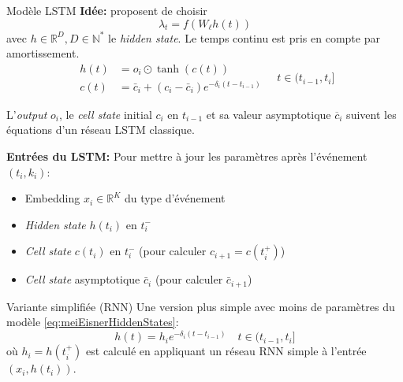 \documentclass{beamer}
\newcommand{\RR}{\mathbb{R}}
\newcommand{\NN}{\mathbb{N}}
\begin{document}
\begin{frame}{Modèle LSTM \autocite{meiEisnerNeuralHawkes}}
\textbf{Idée:} \citeauthor{meiEisnerNeuralHawkes} proposent de choisir 
\begin{equation}
\lambda_t = f(W_\ell h(t))
\end{equation}
avec $h\in\RR^D, D\in\NN^*$ le \textit{hidden state}. Le temps continu est pris en compte par amortissement.
\begin{equation}\label{eq:meiEisnerHiddenStates}
\begin{aligned}
	h(t) &= o_i \odot \tanh(c(t)) \\
	c(t) &= \bar{c}_i + (c_i - \bar{c}_i)e^{-\delta_i(t - t_{i-1})}
\end{aligned} \quad t\in(t_{i-1}, t_i]
\end{equation}
\end{frame}

\begin{frame}
L'\textit{output} $o_i$, le \textit{cell state} initial $c_i$ en $t_{i-1}$ et sa valeur asymptotique $\overline{c}_i$ suivent les équations d'un réseau LSTM classique.

\textbf{Entrées du LSTM:} Pour mettre à jour les paramètres après l'événement $(t_i,k_i)$:\begin{itemize}
	\item[\textbullet] Embedding $x_i\in\RR^K$ du type d'événement
	\item[\textbullet] \textit{Hidden state} $h(t_{i})$ en $t_{i}^{-}$
	\item[\textbullet] \textit{Cell state} $c(t_{i})$ en $t_i^{-}$ (pour calculer $c_{i+1} = c(t_i^{+})$)
	\item[\textbullet] \textit{Cell state} asymptotique $\bar{c}_i$ (pour calculer $\bar{c}_{i+1}$)
\end{itemize}
\end{frame}


\begin{frame}{Variante simplifiée (RNN)}
Une version plus simple avec moins de paramètres du modèle \eqref{eq:meiEisnerHiddenStates}:
\begin{equation}
	h(t) = h_i e^{-\delta_i (t - t_{i-1})}
	\quad t\in (t_{i-1}, t_i]
\end{equation}
où $h_i = h(t_i^{+})$ est calculé en appliquant un réseau RNN simple à l'entrée $(x_i, h(t_i))$.

\end{frame}
\end{document}

